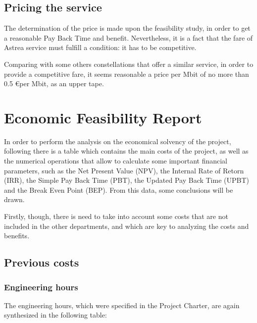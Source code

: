 \subsection{Pricing the service}
The determination of the price is made upon the feasibility study, in order to get a reasonable Pay Back Time and benefit. Nevertheless, it is a fact that the fare of Astrea service must fulfill a condition: it has to be competitive. 

Comparing with some others constellations that offer a similar service, in order to provide a competitive fare, it seems reasonable a price per Mbit of no more than 0.5 \euro per Mbit, as an upper tape.  


\section{Economic Feasibility Report}

In order to perform the analysis on the economical solvency of the project, following there is a table which contains the main costs of the project, as well as the numerical operations that allow to calculate some important financial parameters, such as the Net Present Value (NPV), the Internal Rate of Retorn (IRR), the Simple Pay Back Time (PBT), the Updated Pay Back Time (UPBT) and the Break Even Point (BEP). From this data, some conclusions will be drawn.

Firstly, though, there is need to take into account some costs that are not included in the other departments, and which are key to analyzing the costs and benefits. 
\subsection{Previous costs}
\subsubsection{Engineering hours}
The engineering hours, which were specified in the Project Charter, are again synthesized in the following table:

